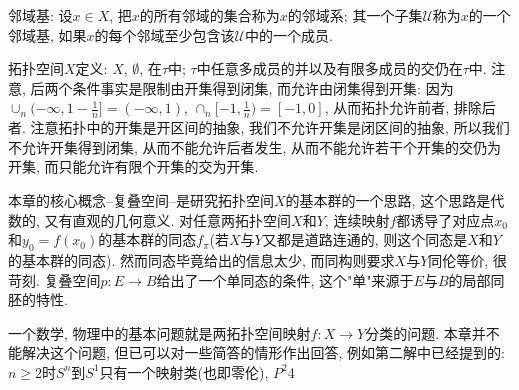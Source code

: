 \documentclass{ctexart}%
\theoremstyle{definition}
\theoremstyle{remark}
\begin{document}
邻域基: 设$x\in X$, 把$x$的所有邻域的集合称为$x$的邻域系; 其一个子集$\mathscr{U}$称为$x$的一个邻域基, 如果$x$的每个邻域至少包含该$\mathscr{U}$中的一个成员. 

拓扑空间$X$定义: $X$, $\emptyset$, 在$\tau$中; $\tau$中任意多成员的并以及有限多成员的交仍在$\tau$中. 注意, 后两个条件事实是限制由开集得到闭集, 而允许由闭集得到开集: 因为$\cup_n(-\infty, 1-\frac{1}{n}]=(-\infty, 1)$, $\cap_n[-1,\frac{1}{n}) = [-1,0]$, 从而拓扑允许前者, 排除后者. 注意拓扑中的开集是开区间的抽象, 我们不允许开集是闭区间的抽象, 所以我们不允许开集得到闭集, 从而不能允许后者发生, 从而不能允许若干个开集的交仍为开集, 而只能允许有限个开集的交为开集. 


本章的核心概念--复叠空间--是研究拓扑空间$X$的基本群的一个思路, 这个思路是代数的, 又有直观的几何意义. 对任意两拓扑空间$X$和$Y$, 连续映射$f$都诱导了对应点$x_0$和$y_0=f(x_0)$的基本群的同态$f_\pi$(若$X$与$Y$又都是道路连通的, 则这个同态是$X$和$Y$的基本群的同态). 然而同态毕竟给出的信息太少, 而同构则要求$X$与$Y$同伦等价, 很苛刻. 复叠空间$p:E\rightarrow B$给出了一个单同态的条件, 这个"单"来源于$E$与$B$的局部同胚的特性. 

一个数学, 物理中的基本问题就是两拓扑空间映射$f:X\rightarrow Y$分类的问题. 本章并不能解决这个问题, 但已可以对一些简答的情形作出回答, 例如第二解中已经提到的: $n\geq 2$时$S^n$到$S^1$只有一个映射类(也即零伦), $P^2$4
\end{document}
